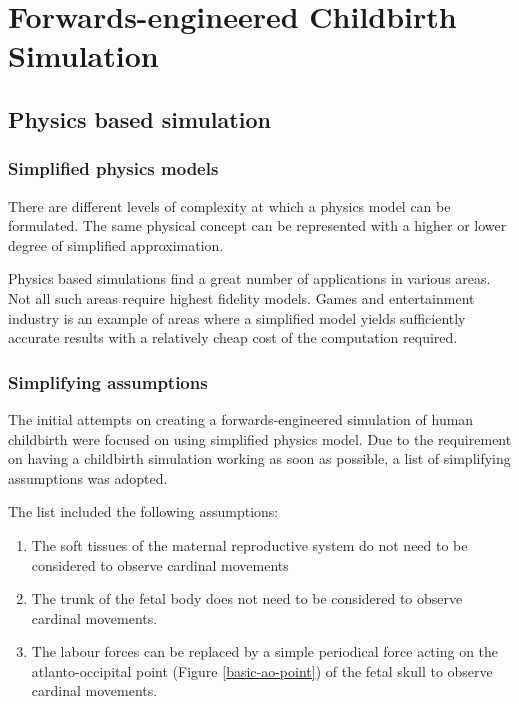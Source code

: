 \section{Forwards-engineered Childbirth Simulation}\label{methodology-basic}

\subsection{Physics based simulation}

  \subsubsection{Simplified physics models}

  There are different levels of complexity at which a physics model can be formulated. The same physical concept can be represented with a higher or lower degree of simplified approximation.

  Physics based simulations find a great number of applications in various areas. Not all such areas require highest fidelity models. Games and entertainment industry is an example of areas where a simplified model yields sufficiently accurate results with a relatively cheap cost of the computation required.

  \subsubsection{Simplifying assumptions}

  The initial attempts on creating a forwards-engineered simulation of human childbirth were focused on using simplified physics model. Due to the requirement on having a childbirth simulation working as soon as possible, a list of simplifying assumptions was adopted.

  The list included the following assumptions:

  \begin{enumerate}

    \item The soft tissues of the maternal reproductive system do not need to be considered to observe cardinal movements
    \item The trunk of the fetal body does not need to be considered to observe cardinal movements.
    \item The labour forces can be replaced by a simple periodical force acting on the atlanto-occipital point (Figure \ref{basic-ao-point}) of the fetal skull to observe cardinal movements.

  \end{enumerate}

